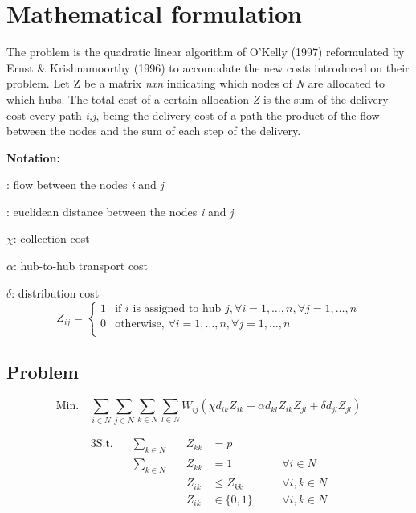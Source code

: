 \section{Mathematical formulation}

The problem  is the quadratic linear algorithm of O'Kelly (1997)\cite{OKelly1987}
reformulated by Ernst \& Krishnamoorthy (1996)\cite{Ernst1996} to accomodate the new costs
introduced on their problem. Let Z be a matrix \emph{nxn} indicating which nodes of \emph{N} are
allocated to which hubs. The total cost of a certain allocation \emph{Z} is the sum of the
delivery cost every path \emph{i,j}, being the delivery cost of a path the product of the
flow between the nodes and the sum of each step of the delivery.

\break

\textbf{Notation:}

\wij: flow between the nodes \emph{i} and \emph{j}

: euclidean distance between the nodes \emph{i} and \emph{j} 

$\chi$: collection cost

$\alpha$: hub-to-hub transport cost

$\delta$: distribution cost
\[
Z_{ij} = \begin{cases}
  1 & \text{if } i \text{ is assigned to hub } j, \forall i = 1,\dots,n, \forall j = 1,\dots,n \\
  0 & \text{otherwise, }\forall i = 1,\dots,n, \forall j = 1,\dots,n \\
\end{cases}
\]

\subsection{Problem }

\[
  \text{Min.} \quad \sum_{i\in N}\sum_{j\in N}\sum_{k\in N}\sum_{l\in N} W_{ij}(\chi d_{ik} Z_{ik} + \alpha d_{kl} Z_{ik} Z_{jl} + \delta d_{jl} Z_{jl})
\]

\begin{alignat}{3}
  \text{S.t.} \quad & \sum_{k \in N} & \quad Z_{kk} &= p         & \label{p_hubs}\\
                    & \sum_{k \in N} & \quad Z_{kk} &= 1         & \quad & \forall i \in N \label{eq:single_alloc} \\
                    &                & \quad Z_{ik} &\le Z_{kk}  & \quad & \forall i, k \in N \label{eq:only_hubs} \\
                    &                & \quad Z_{ik} &\in \{0,1\} & \quad & \forall i, k \in N \label{eq:prev_alloc}
\end{alignat}


